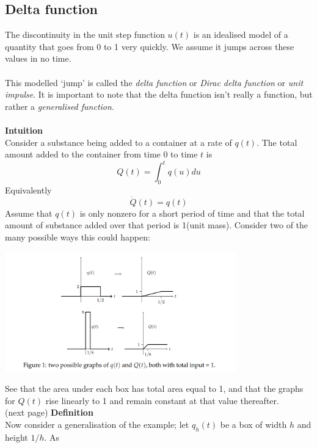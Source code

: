 \documentclass{report}
\begin{document}
\subsection{Delta function}
The discontinuity in the unit step function $u(t)$ is an idealised model of a quantity
that goes from 0 to 1 very quickly. We assume it jumps across these values in no time.\\
\vspace{1mm}\\
This modelled `jump' is called the \textit{delta function} or \textit{Dirac delta function} or 
\textit{unit impulse}.
It is important to note that the delta function isn't really a function, but rather a 
\textit{generalised function}.\\
\vspace{1mm}\\
\textbf{Intuition}\\
Consider a substance being added to a container at a rate of $q(t)$. The total amount added to the container
from time 0 to time $t$ is
\begin{equation*}
Q(t)=\int^t_0q(u)du
\end{equation*}
Equivalently
\begin{equation*}
\dot{Q}(t)=q(t)
\end{equation*}
Assume that $q(t)$ is only nonzero for a short period of time and that the total amount of substance added
over that period is 1(unit mass). Consider two of the many possible ways this could happen:
\begin{center}
\includegraphics[width=10cm]{45}\\
\end{center}
See that the area under each box has total area equal to 1, and that the graphs for $Q(t)$ rise linearly to 1 and 
remain constant at that value thereafter.\\
(next page)\newpage
\noindent\textbf{Definition}\\
Now consider a generalisation of the example; let $q_h(t)$ be a box of width $h$ and height $1/h$. As
\end{document}
